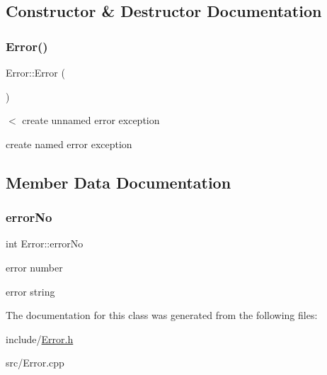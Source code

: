 \subsection{Constructor \& Destructor Documentation}
\mbox{\label{classError_aca339d00ad8481fb4c184f0ece42698b}} 
\subsubsection{\texorpdfstring{Error()}{Error()}}
{\footnotesize\ttfamily Error\+::\+Error (\begin{DoxyParamCaption}{ }\end{DoxyParamCaption})\hspace{0.3cm}{\ttfamily [inline]}}



$<$ create unnamed error exception 

create named error exception 

\subsection{Member Data Documentation}
\mbox{\label{classError_aca10c20ddc3769ff18c87d98052bbc3e}} 
\subsubsection{\texorpdfstring{error\+No}{errorNo}}
{\footnotesize\ttfamily int Error\+::error\+No\hspace{0.3cm}{\ttfamily [protected]}}



error number 

error string 

The documentation for this class was generated from the following files\+:\begin{DoxyCompactItemize}
\item 
include/\hyperlink{Error_8h}{Error.\+h}\item 
src/Error.\+cpp\end{DoxyCompactItemize}
